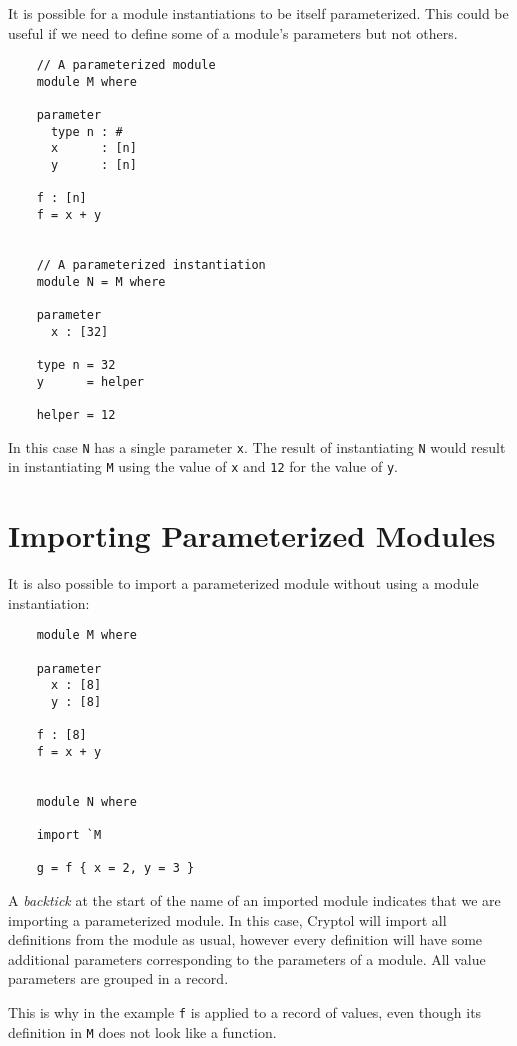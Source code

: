 It is possible for a module instantiations to be itself parameterized.
This could be useful if we need to define some of a module's parameters
but not others.


\begin{verbatim}
    // A parameterized module
    module M where

    parameter
      type n : #
      x      : [n]
      y      : [n]

    f : [n]
    f = x + y


    // A parameterized instantiation
    module N = M where

    parameter
      x : [32]

    type n = 32
    y      = helper

    helper = 12
\end{verbatim}

In this case \texttt{N} has a single parameter \texttt{x}.  The result of instantiating
\texttt{N} would result in instantiating \texttt{M} using the value of \texttt{x} and \texttt{12}
for the value of \texttt{y}.


\section{Importing Parameterized Modules}

It is also possible to import a parameterized module without using
a module instantiation:

\begin{verbatim}
    module M where

    parameter
      x : [8]
      y : [8]

    f : [8]
    f = x + y


    module N where

    import `M

    g = f { x = 2, y = 3 }
\end{verbatim}

A \textit{backtick} at the start of the name of an imported module indicates
that we are importing a parameterized module.  In this case, Cryptol
will import all definitions from the module as usual, however every
definition will have some additional parameters corresponding to
the parameters of a module.  All value parameters are grouped in a record.

This is why in the example \texttt{f} is applied to a record of values,
even though its definition in \texttt{M} does not look like a function.
